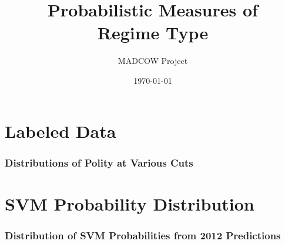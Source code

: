 \documentclass[10pt]{beamer}
\title[Regime Classification \hspace{14em} \insertframenumber/
\inserttotalframenumber]{Probabilistic Measures of \\ Regime Type}
\author{MADCOW Project}
\date{\today}
\begin{document}
\begin{frame}
\titlepage
\end{frame}

\section{Labeled Data}

\begin{frame}
\frametitle{Distributions of Polity at Various Cuts}

\begin{figure}[ht]
	\centering
	\resizebox{1\textwidth}{!}{}	
\end{figure}

\end{frame}

\section{SVM Probability Distribution}

\begin{frame}
\frametitle{Distribution of SVM Probabilities from 2012 Predictions}

\begin{figure}[ht]
	\centering
	\resizebox{1\textwidth}{!}{}	
\end{figure}

\end{frame}
\end{document}
